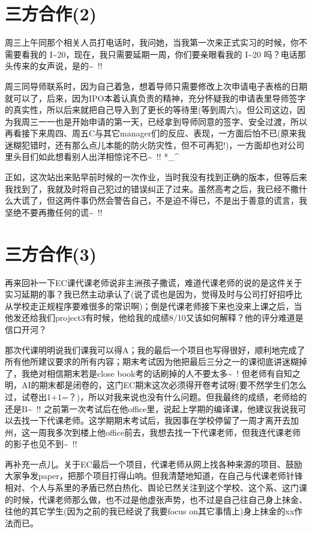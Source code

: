 \documentclass[12pt]{book}
\begin{document}
\section{三方合作(2)}
\label{sec-38-2}

周三上午同那个相关人员打电话时，我问她，当我第一次来正式实习的时候，你不需要看我的 I\textasciitilde{}20，现在，我只需要延期一周，你们要亲眼看我的 I\textasciitilde{}20 吗？电话那头传来的女声说，是的\textasciitilde{}~!!

周三同导师联系时，因为自己着急，想着导师只需要修改上次申请电子表格的日期就可以了，后来，因为IPO本着认真负责的精神，充分怀疑我的申请表里导师签字的真实性，所以后来就把自己导入到了更长的等待里(等到周六)。但公司这边，因为我周三一一也是开始申请的第一天，已经拿到导师同意的签字、安全过渡，所以再看接下来周四、周五C与其它manager们的反应、表现，一方面后怕不已(原来我迷糊犯错时，还有那么点儿本能的防火防灾性，但不可再犯!)，一方面却也对公司里头目们如此想看别人出洋相惊诧不已\textasciitilde{}~!! *\_\^{}

正如，这次站出来贴早前时候的一次作业，当时我没有找到正确的版本，但等后来我找到了，我就及时将自己犯过的错误纠正了过来。虽然高考之后，我已经不撒什么大谎了，但这两件事仍然会警告自己，不是迫不得已，不是出于善意的谎言，我坚绝不要再撒任何的谎\textasciitilde{}~!! 

\section{三方合作(3)}
\label{sec-38-3}

再来回补一下EC课代课老师说非主洲孩子撒谎，难道代课老师的说的是这件关于实习延期的事？我已然主动承认了(说了谎也是因为，觉得及时与公司打好招呼比从学校走正规程序要难很多的常识啊)；倒是代课老师接下来也没来上课之后，当他发还给我们project3有时候，他给我的成绩8/10又该如何解释？他的评分难道是信口开河？

那次代课明明说我们课我可以得A；我的最后一个项目也写得很好，顺利地完成了所有他所建议要求的所有内容；期末考试因为他把最后三分之一的课彻底讲迷糊掉了，我绝对相信期末若是close book考的话刷掉的人不要太多\textasciitilde{}~! 但老师有自知之明，AI的期末都是闭卷的，这门EC期末这次必须得开卷考试呀(要不然学生们怎么过，试卷出1+1=？)，所以对我来说也没有什么问题。但我最终的成绩，老师给的还是B\textasciitilde{}~!! 之前第一次考试后在他office里，说起上学期的编译课，他建议我说我可以去找一下代课老师。这学期期末考试后，我因事在学校停留了一周才离开去加州，这一周我多次到楼上他office前去，我想去找一下代课老师，但我连代课老师的影子也见不到\textasciitilde{}~!!

再补充一点儿。关于EC最后一个项目，代课老师从网上找各种来源的项目、鼓励大家争发paper，把那个项目打得山响。但我清楚地知道，在自己与代课老师针锋相对、个人与系里的矛盾已然白热化、舆论已然关注到这个学校、这个系、这门课的时候，代课老师那么做，也不过是他虚张声势，也不过是自己往自己身上抹金、往他的其它学生(因为之前的我已经说了我要focus on其它事情上)身上抹金的xx作法而已。
\end{document}
